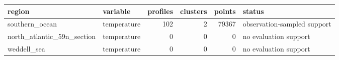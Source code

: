 \begin{tabular}{llrrrl}
\toprule
region & variable & profiles & clusters & points & status \\
\midrule
southern_ocean & temperature & 102 & 2 & 79367 & observation-sampled support \\
north_atlantic_59n_section & temperature & 0 & 0 & 0 & no evaluation support \\
weddell_sea & temperature & 0 & 0 & 0 & no evaluation support \\
\bottomrule
\end{tabular}
